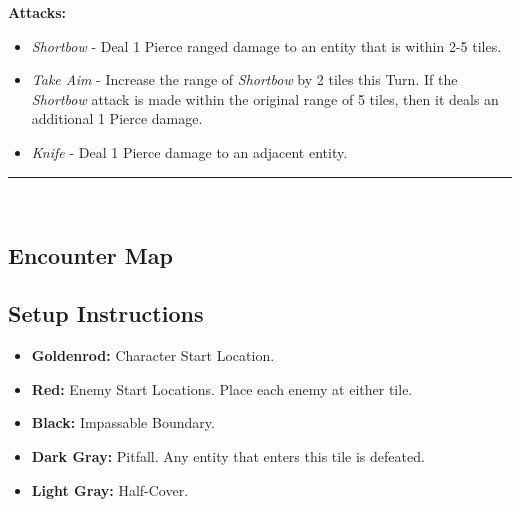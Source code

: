 \textbf{Attacks:}
\begin{itemize}
\item \emph{Shortbow} - Deal 1 Pierce ranged damage to an entity that is within 2-5 tiles.
\item \emph{Take Aim} - Increase the range of \emph{Shortbow} by 2 tiles this Turn. If the \emph{Shortbow} attack is made within the original range of 5 tiles, then it deals an additional 1 Pierce damage.
\item \emph{Knife} - Deal 1 Pierce damage to an adjacent entity.
\end{itemize}
\hrule
\ \\

\subsection*{Encounter Map}
\begin{center}
\end{center}

\subsection*{Setup Instructions}
\begin{itemize}
\item \textbf{Goldenrod:} Character Start Location.
\item \textbf{Red:} Enemy Start Locations. Place each enemy at either tile.
\item \textbf{Black:} Impassable Boundary.
\item \textbf{Dark Gray:} Pitfall. Any entity that enters this tile is defeated.
\item \textbf{Light Gray:} Half-Cover.
\end{itemize}

